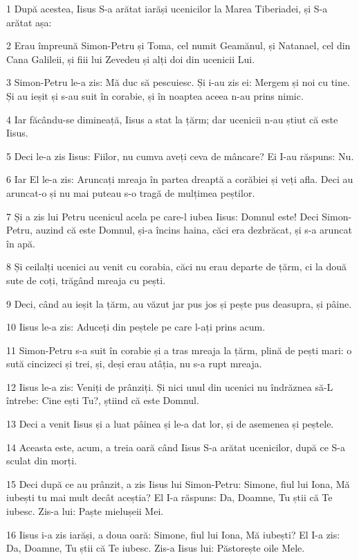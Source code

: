 \par 1 După acestea, Iisus S-a arătat iarăși ucenicilor la Marea Tiberiadei, și S-a arătat așa:
\par 2 Erau împreună Simon-Petru și Toma, cel numit Geamănul, și Natanael, cel din Cana Galileii, și fiii lui Zevedeu și alți doi din ucenicii Lui.
\par 3 Simon-Petru le-a zis: Mă duc să pescuiesc. Și i-au zis ei: Mergem și noi cu tine. Și au ieșit și s-au suit în corabie, și în noaptea aceea n-au prins nimic.
\par 4 Iar făcându-se dimineață, Iisus a stat la țărm; dar ucenicii n-au știut că este Iisus.
\par 5 Deci le-a zis Iisus: Fiilor, nu cumva aveți ceva de mâncare? Ei I-au răspuns: Nu.
\par 6 Iar El le-a zis: Aruncați mreaja în partea dreaptă a corăbiei și veți afla. Deci au aruncat-o și nu mai puteau s-o tragă de mulțimea peștilor.
\par 7 Și a zis lui Petru ucenicul acela pe care-l iubea Iisus: Domnul este! Deci Simon-Petru, auzind că este Domnul, și-a încins haina, căci era dezbrăcat, și s-a aruncat în apă.
\par 8 Și ceilalți ucenici au venit cu corabia, căci nu erau departe de țărm, ci la două sute de coți, trăgând mreaja cu pești.
\par 9 Deci, când au ieșit la țărm, au văzut jar pus jos și pește pus deasupra, și pâine.
\par 10 Iisus le-a zis: Aduceți din peștele pe care l-ați prins acum.
\par 11 Simon-Petru s-a suit în corabie și a tras mreaja la țărm, plină de pești mari: o sută cincizeci și trei, și, deși erau atâția, nu s-a rupt mreaja.
\par 12 Iisus le-a zis: Veniți de prânziți. Și nici unul din ucenici nu îndrăznea să-L întrebe: Cine ești Tu?, știind că este Domnul.
\par 13 Deci a venit Iisus și a luat pâinea și le-a dat lor, și de asemenea și peștele.
\par 14 Aceasta este, acum, a treia oară când Iisus S-a arătat ucenicilor, după ce S-a sculat din morți.
\par 15 Deci după ce au prânzit, a zis Iisus lui Simon-Petru: Simone, fiul lui Iona, Mă iubești tu mai mult decât aceștia? El I-a răspuns: Da, Doamne, Tu știi că Te iubesc. Zis-a lui: Paște mielușeii Mei.
\par 16 Iisus i-a zis iarăși, a doua oară: Simone, fiul lui Iona, Mă iubești? El I-a zis: Da, Doamne, Tu știi că Te iubesc. Zis-a Iisus lui: Păstorește oile Mele.
